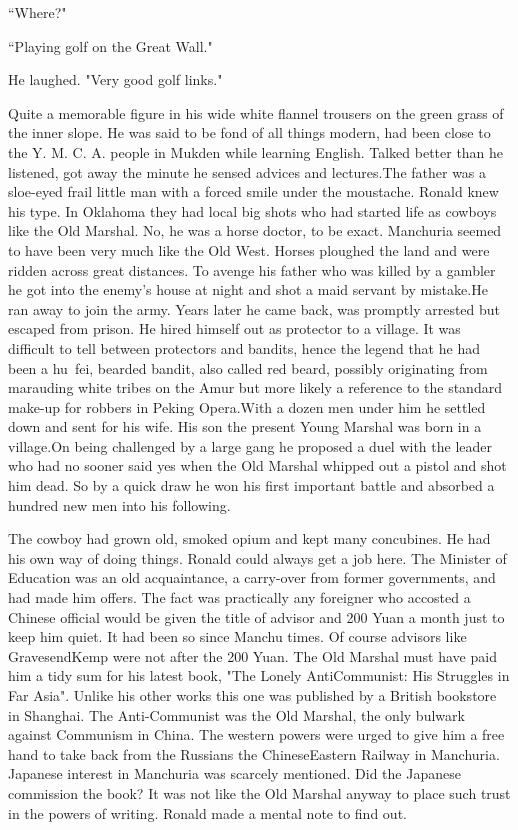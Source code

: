 \par ``Where?"
\par ``Playing golf on the Great Wall."
\par He laughed. "Very good golf links."
\par Quite a memorable figure in his wide white flannel trousers on the green grass of the inner slope. He was said to be fond of all things modern, had been close to the Y. M. C. A. people in Mukden while learning English. Talked better than he listened, got away the minute he sensed advices and lectures.The father was a sloe-eyed frail little man with a forced smile under the moustache. Ronald knew his type. In Oklahoma they had local big shots who had started life as cowboys like the Old Marshal. No, he was a horse doctor, to be exact. Manchuria seemed to have been very much like the Old West. Horses ploughed the land and were ridden across great distances. To avenge his father who was killed by a gambler he got into the enemy's house at night and shot a maid servant by mistake.He ran away to join the army. Years later he came back, was promptly arrested but escaped from prison. He hired himself out as protector to a village. It was difficult to tell between protectors and bandits, hence the legend that he had been a hu fei, bearded bandit, also called red beard, possibly originating from marauding white tribes on the Amur but more likely a reference to the standard make-up for robbers in Peking Opera.With a dozen men under him he settled down and sent for his wife. His son the present Young Marshal was born in a village.On being challenged by a large gang he proposed a duel with the leader who had no sooner said yes when the Old Marshal whipped out a pistol and shot him dead. So by a quick draw he won his first important battle and absorbed a hundred new men into his following.
\par The cowboy had grown old, smoked opium and kept many concubines. He had his own way of doing things. Ronald could always get a job here. The Minister of Education was an old acquaintance, a carry-over from former governments, and had made him offers. The fact was practically any foreigner who accosted a Chinese official would be given the title of advisor and 200 Yuan a month just to keep him quiet. It had been so since Manchu times. Of course advisors like GravesendKemp were not after the 200 Yuan. The Old Marshal must have paid him a tidy sum for his latest book, "The Lonely AntiCommunist: His Struggles in Far Asia". Unlike his other works this one was published by a British bookstore in Shanghai. The Anti-Communist was the Old Marshal, the only bulwark against Communism in China. The western powers were urged to give him a free hand to take back from the Russians the ChineseEastern Railway in Manchuria. Japanese interest in Manchuria was scarcely mentioned. Did the Japanese commission the book? It was not like the Old Marshal anyway to place such trust in the powers of writing. Ronald made a mental note to find out.

